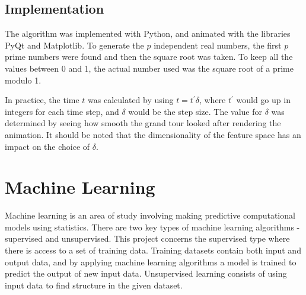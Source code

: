\documentclass[a4paper,11pt,twoside]{article}
\begin{document}
\subsection{Implementation}

The algorithm was implemented with Python, and animated with the libraries PyQt and Matplotlib. To generate the $p$ independent real numbers, the first $p$ prime numbers were found and then the square root was taken. To keep all the values between 0 and 1, the actual number used was the square root of a prime modulo 1. 
\newline

In practice, the time $t$ was calculated by using $t=t^\prime \delta$, where $t^\prime$ would go up in integers for each time step, and $\delta$ would be the step size. The value for $\delta$ was determined by seeing how smooth the grand tour looked after rendering the animation. It should be noted that the dimensionality of the feature space has an impact on the choice of $\delta$.

\newpage
\section{Machine Learning}

Machine learning is an area of study involving making predictive computational models using statistics. There are two key types of machine learning algorithms - supervised and unsupervised. This project concerns the supervised type where there is access to a set of training data. Training datasets contain both input and output data, and by applying machine learning algorithms a model is trained to predict the output of new input data. Unsupervised learning consists of using input data to find structure in the given dataset.
\newline
\end{document}

